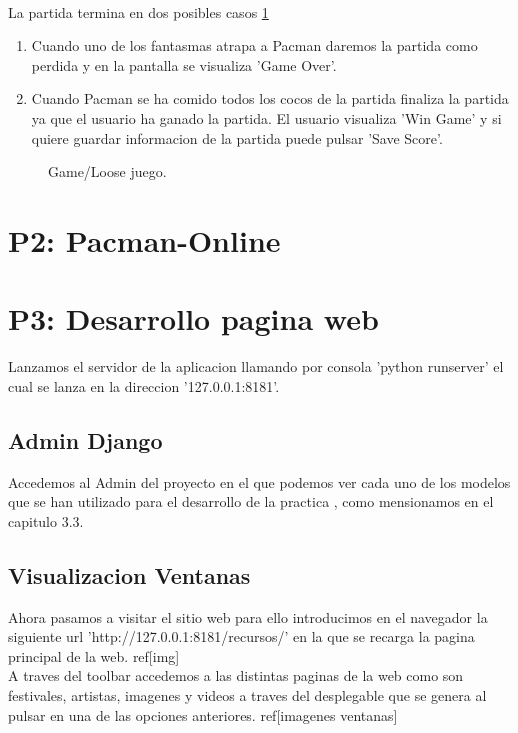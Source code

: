 \\La partida termina en dos posibles casos \ref{fig:Game/Loose game}
\begin{enumerate}
\item Cuando uno de los fantasmas atrapa a Pacman daremos la partida como perdida y en la pantalla se visualiza 'Game Over'.
\item Cuando Pacman se ha comido todos los cocos de la partida finaliza la partida ya que el usuario ha ganado la partida. El usuario visualiza 'Win Game' y si quiere guardar informacion de la partida puede pulsar 'Save Score'.
\end{enumerate}
\begin{figure}[htbp]
\centering
{}
\caption{Game/Loose juego.} \label{fig:Game/Loose game}
\end{figure}
\section{P2: Pacman-Online}
\section{P3: Desarrollo pagina web}
Lanzamos el servidor de la aplicacion llamando por consola 'python runserver'
el cual se lanza en la  direccion '127.0.0.1:8181'.
\subsection{Admin Django}
Accedemos al Admin del proyecto en el que podemos ver cada uno de los modelos que se han utilizado para el desarrollo de la practica , como mensionamos en el capitulo 3.3.


\subsection{Visualizacion Ventanas}
Ahora pasamos a visitar el sitio web para ello introducimos en el navegador la siguiente url 'http://127.0.0.1:8181/recursos/' en la que se recarga la pagina principal de la web. ref[img]
\\A traves del toolbar accedemos a las distintas paginas de la web como son festivales, artistas, imagenes y videos a traves del desplegable que se genera al pulsar en una de las opciones anteriores. ref[imagenes ventanas]

